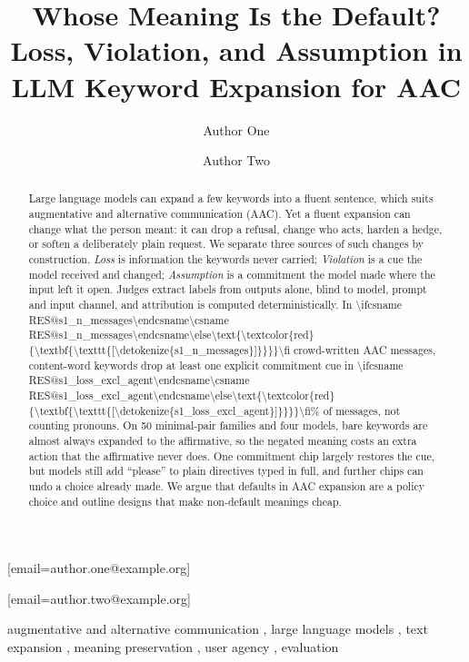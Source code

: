 \documentclass{ceurart}
\makeatletter
\newcommand{\RES}[1]{\ifcsname RES@#1\endcsname\csname RES@#1\endcsname\else\RESmissing{#1}\fi}
\newcommand{\RESmissing}[1]{\text{\textcolor{red}{\textbf{\texttt{[\detokenize{#1}]}}}}}
\makeatother
\begin{document}


\title{Whose Meaning Is the Default? Loss, Violation, and Assumption in LLM Keyword Expansion for AAC}

\author[1]{Author One}[email=author.one@example.org]
\address[1]{Affiliation, City, Country}
\author[1]{Author Two}[email=author.two@example.org]

\begin{abstract}
Large language models can expand a few keywords into a fluent sentence, which suits augmentative and alternative communication (AAC).
Yet a fluent expansion can change what the person meant: it can drop a refusal, change who acts, harden a hedge, or soften a deliberately plain request.
We separate three sources of such changes by construction.
\emph{Loss} is information the keywords never carried; \emph{Violation} is a cue the model received and changed; \emph{Assumption} is a commitment the model made where the input left it open.
Judges extract labels from outputs alone, blind to model, prompt and input channel, and attribution is computed deterministically.
In \num{\RES{s1_n_messages}} crowd-written AAC messages, content-word keywords drop at least one explicit commitment cue in \num{\RES{s1_loss_excl_agent}}\% of messages, not counting pronouns. %
On 50 minimal-pair families and four models, bare keywords are almost always expanded to the affirmative, so the negated meaning costs an extra action that the affirmative never does. %
One commitment chip largely restores the cue, but models still add ``please'' to plain directives typed in full, and further chips can undo a choice already made. %
We argue that defaults in AAC expansion are a policy choice and outline designs that make non-default meanings cheap.
\end{abstract}

\begin{keywords}
  augmentative and alternative communication \sep
  large language models \sep
  text expansion \sep
  meaning preservation \sep
  user agency \sep
  evaluation
\end{keywords}
\end{document}
